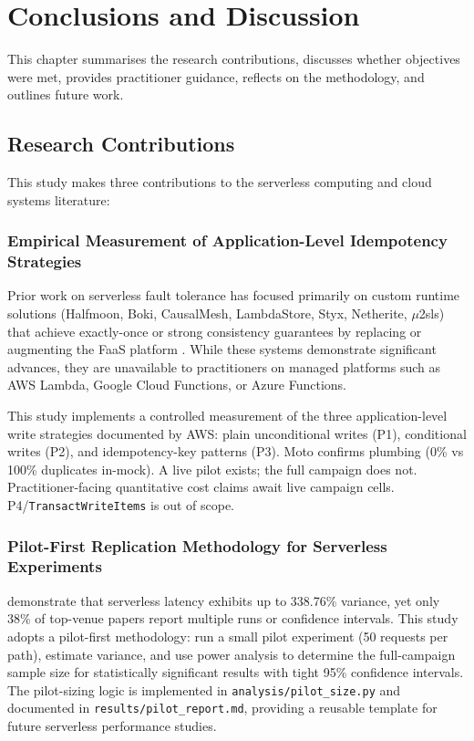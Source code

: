 \chapter{Conclusions and Discussion}

This chapter summarises the research contributions, discusses whether objectives were met, provides practitioner guidance, reflects on the methodology, and outlines future work.

\section{Research Contributions}

This study makes three contributions to the serverless computing and cloud systems literature:

\subsection{Empirical Measurement of Application-Level Idempotency Strategies}

Prior work on serverless fault tolerance has focused primarily on custom runtime solutions (Halfmoon, Boki, CausalMesh, LambdaStore, Styx, Netherite, $\mu$2sls) that achieve exactly-once or strong consistency guarantees by replacing or augmenting the FaaS platform \citep{Qi2025Halfmoon, Jia2024Boki, Zhang2024CausalMesh, Mast2026LambdaStore, Psarakis2025Styx, Burckhardt2022Netherite, Kallas2023Mu2sls}. While these systems demonstrate significant advances, they are unavailable to practitioners on managed platforms such as AWS Lambda, Google Cloud Functions, or Azure Functions.

This study implements a controlled measurement of the three application-level write strategies documented by AWS: plain unconditional writes (P1), conditional writes (P2), and idempotency-key patterns (P3). Moto confirms plumbing (0\% vs 100\% duplicates in-mock). A live pilot exists; the full campaign does not. Practitioner-facing quantitative cost claims await live campaign cells. P4/\texttt{TransactWriteItems} is out of scope.

\subsection{Pilot-First Replication Methodology for Serverless Experiments}

\citet{Wen2025Variance} demonstrate that serverless latency exhibits up to 338.76\% variance, yet only 38\% of top-venue papers report multiple runs or confidence intervals. This study adopts a pilot-first methodology: run a small pilot experiment (50 requests per path), estimate variance, and use power analysis to determine the full-campaign sample size for statistically significant results with tight 95\% confidence intervals. The pilot-sizing logic is implemented in \texttt{analysis/pilot\_size.py} and documented in \texttt{results/pilot\_report.md}, providing a reusable template for future serverless performance studies.

